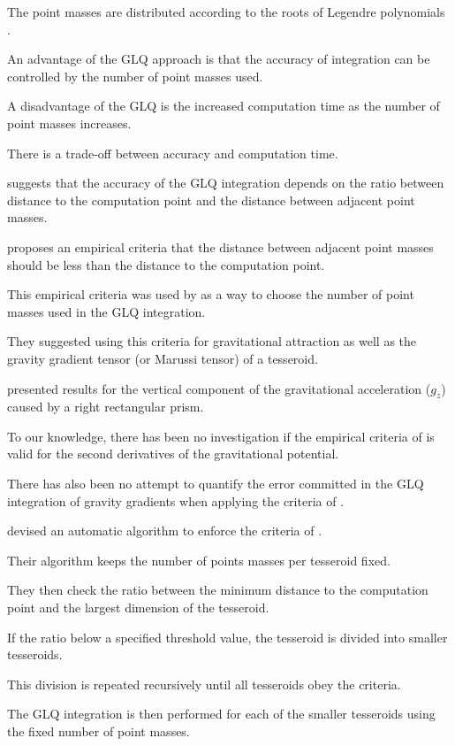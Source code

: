 \documentclass[extra,mreferee]{gji}
\begin{document}
The point masses are distributed according to the roots of Legendre polynomials
\citep{Hildebrand1987}.

An advantage of the GLQ approach is that the accuracy of integration can be
controlled by the number of point masses used.

A disadvantage of the GLQ is the increased computation time as the number of
point masses increases.

There is a trade-off between accuracy and computation time.

\citet{Ku1977} suggests that the accuracy of the GLQ integration depends on
the ratio between distance to the computation point and the distance between
adjacent point masses.

\citet{Ku1977} proposes an empirical criteria that the distance between adjacent
point masses should be less than the distance to the computation point.

This empirical criteria was used by \citet{Asgharzadeh2007} as a way to
choose the number of point masses used in the GLQ integration.

They suggested using this criteria for gravitational attraction as well as
the gravity gradient tensor (or Marussi tensor) of a tesseroid.

\citet{Ku1977} presented results for the vertical component of the
gravitational acceleration ($g_z$) caused by a right rectangular prism.

To our knowledge, there has been no investigation if the empirical criteria of
\citet{Ku1977} is valid for the second derivatives of the
gravitational potential.

There has also been no attempt to quantify the error committed in the GLQ
integration of gravity gradients when applying the criteria of \citet{Ku1977}.

\citet{Li2011} devised an automatic algorithm to enforce the criteria of
\citet{Ku1977}.

Their algorithm keeps the number of points masses per tesseroid fixed.

They then check the ratio between the minimum distance to the computation point
and the largest dimension of the tesseroid.

If the ratio below a specified threshold value, the tesseroid is divided into
smaller tesseroids.

This division is repeated recursively until all tesseroids obey the criteria.

The GLQ integration is then performed for each of the smaller tesseroids
using the fixed number of point masses.
\end{document}
